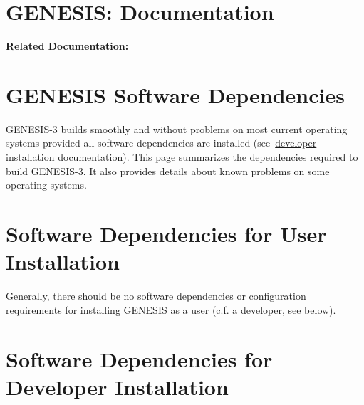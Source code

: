 \documentclass[12pt]{article}
\begin{document}
\section*{GENESIS: Documentation}

{\bf Related Documentation:}

\section*{GENESIS Software Dependencies}

GENESIS-3 builds smoothly and without problems on most current
operating systems provided all software dependencies are installed
(see~\href{../developer-installation/developer-installation.tex}{developer
  installation documentation}).  This page summarizes the dependencies
required to build GENESIS-3.  It also provides details about known
problems on some operating systems.


\section*{Software Dependencies for User Installation}

Generally, there should be no software dependencies or configuration requirements for installing GENESIS as a user (c.f. a developer, see below).




\section*{Software Dependencies for Developer Installation}
\end{document}
